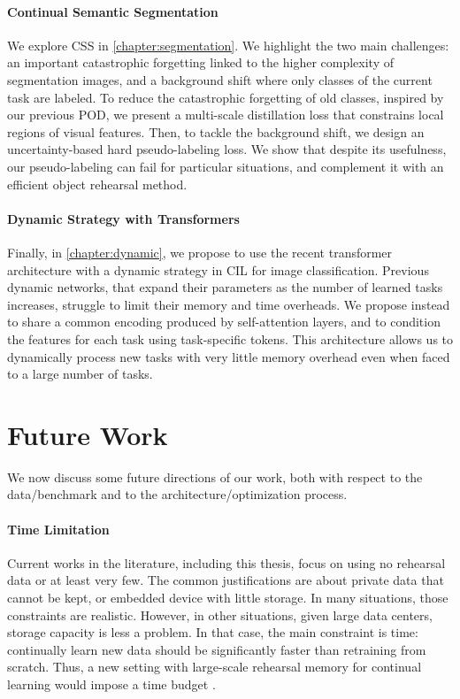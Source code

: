 \paragraph{Continual Semantic Segmentation} We explore \ac{CSS} in \autoref{chapter:segmentation}.
We highlight the two main challenges: an important catastrophic forgetting linked to the higher
complexity of segmentation images, and a background shift where only classes of the current task are
labeled. To reduce the catastrophic forgetting of old classes, inspired by our previous POD, we
present a multi-scale distillation loss that constrains local regions of visual features. Then, to
tackle the background shift, we design an uncertainty-based hard pseudo-labeling loss. We show that
despite its usefulness, our pseudo-labeling can fail for particular situations, and complement it
with an efficient object rehearsal method.

\paragraph{Dynamic Strategy with Transformers} Finally, in \autoref{chapter:dynamic}, we propose to
use the recent transformer architecture with a dynamic strategy in \acf{CIL} for image
classification. Previous dynamic networks, that expand their parameters as the number of learned
tasks increases, struggle to limit their memory and time overheads. We propose instead to share a
common encoding produced by self-attention layers, and to condition the features for each task using
task-specific tokens. This architecture allows us to dynamically process new tasks with very little
memory overhead even when faced to a large number of tasks.

\section{Future Work}

We now discuss some future directions of our work, both with respect to the data/benchmark and to
the architecture/optimization process.

\vspace{2em}

\paragraph{Time Limitation} Current works in the literature, including this thesis, focus on using
no rehearsal data or at least very few. The common justifications are about private data that cannot
be kept, or embedded device with little storage. In many situations, those constraints are
realistic. However, in other situations, given large data centers, storage capacity is less a
problem. In that case, the main constraint is time: continually learn new data should be
significantly faster than retraining from scratch. Thus, a new setting with large-scale rehearsal
memory for continual learning would impose a time budget \citep{veniat2018budgetedlearning}.

